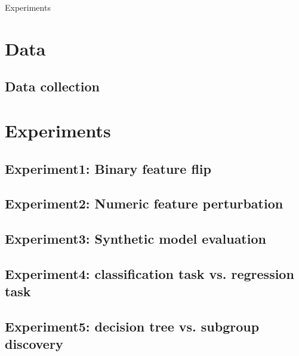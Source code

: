 Experiments


\section{Data}


\subsection{Data collection}


\section{Experiments}

\subsection{Experiment1: Binary feature flip}

\subsection{Experiment2: Numeric feature perturbation}

\subsection{Experiment3: Synthetic model evaluation}

\subsection{Experiment4: classification task vs. regression task}

\subsection{Experiment5: decision tree vs. subgroup discovery}